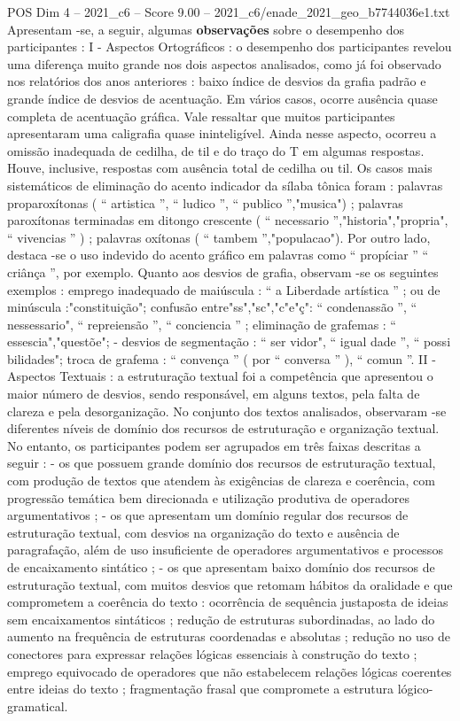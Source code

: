 \begin{textsample}{POS Dim 4 – 2021\_c6 – Score 9.00 – 2021\_c6/enade\_2021\_geo\_b7744036e1.txt}
Apresentam -se, a seguir, algumas \textbf{observações} sobre o desempenho dos participantes : I - Aspectos Ortográficos : o desempenho dos participantes revelou uma diferença muito grande nos dois aspectos analisados, como já foi observado nos relatórios dos anos anteriores : baixo índice de desvios da grafia padrão e grande índice de desvios de acentuação.
Em vários casos, ocorre ausência quase completa de acentuação gráfica.
Vale ressaltar que muitos participantes apresentaram uma caligrafia quase ininteligível.
Ainda nesse aspecto, ocorreu a omissão inadequada de cedilha, de til e do traço do T em algumas respostas.
Houve, inclusive, respostas com ausência total de cedilha ou til.
Os casos mais sistemáticos de eliminação do acento indicador da sílaba tônica foram : palavras proparoxítonas ( “ artistica ”, “ ludico ”, “ publico ”,"musica") ; palavras paroxítonas terminadas em ditongo crescente ( “ necessario ”,"historia","propria", “ vivencias ” ) ; palavras oxítonas ( “ tambem ”,"populacao").
Por outro lado, destaca -se o uso indevido do acento gráfico em palavras como “ propíciar ” “ criânça ”, por exemplo.
Quanto aos desvios de grafia, observam -se os seguintes exemplos : emprego inadequado de maiúscula : “ a Liberdade artística ” ; ou de minúscula :"constituição"; confusão entre"ss","sc","c"e"ç": “ condenassão ”, “ nessessario", “ repreiensão ”, “ conciencia ” ; eliminação de grafemas : “ essescia","questõe"; - desvios de segmentação : “ ser vidor", “ igual dade ”, “ possi bilidades"; troca de grafema : “ convença ” ( por “ conversa ” ), “ comun ”.
II - Aspectos Textuais : a estruturação textual foi a competência que apresentou o maior número de desvios, sendo responsável, em alguns textos, pela falta de clareza e pela desorganização.
No conjunto dos textos analisados, observaram -se diferentes níveis de domínio dos recursos de estruturação e organização textual.
No entanto, os participantes podem ser agrupados em três faixas descritas a seguir : - os que possuem grande domínio dos recursos de estruturação textual, com produção de textos que atendem às exigências de clareza e coerência, com progressão temática bem direcionada e utilização produtiva de operadores argumentativos ; - os que apresentam um domínio regular dos recursos de estruturação textual, com desvios na organização do texto e ausência de paragrafação, além de uso insuficiente de operadores argumentativos e processos de encaixamento sintático ; - os que apresentam baixo domínio dos recursos de estruturação textual, com muitos desvios que retomam hábitos da oralidade e que comprometem a coerência do texto : ocorrência de sequência justaposta de ideias sem encaixamentos sintáticos ; redução de estruturas subordinadas, ao lado do aumento na frequência de estruturas coordenadas e absolutas ; redução no uso de conectores para expressar relações lógicas essenciais à construção do texto ; emprego equivocado de operadores que não estabelecem relações lógicas coerentes entre ideias do texto ; fragmentação frasal que compromete a estrutura lógico-gramatical.

\end{textsample}
